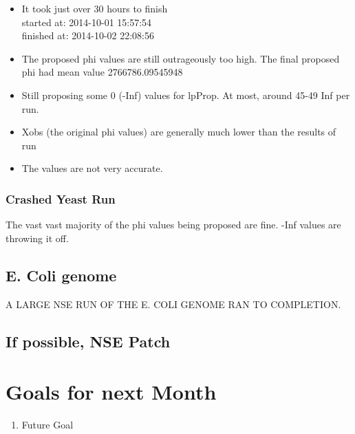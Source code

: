 \begin{itemize}
\item It took just over 30 hours to finish\\
started at: 2014-10-01 15:57:54\\
finished at: 2014-10-02 22:08:56 

\item The proposed phi values are still outrageously too high. The final proposed phi had mean value 2766786.09545948

\item Still proposing some 0 (-Inf) values for lpProp. At most, around 45-49 Inf per run.

\item Xobs (the original phi values) are generally much lower than the results of run

\item The values are not very accurate.

\end{itemize}


\subsubsection{Crashed Yeast Run}

The vast vast majority of the phi values being proposed are fine. -Inf values are throwing it off. 


\subsection{E. Coli genome}

A LARGE NSE RUN OF THE E. COLI GENOME RAN TO COMPLETION.



\subsection{If possible, NSE Patch}






\section{Goals for next Month}
\begin{enumerate}
\item Future Goal
\end{enumerate}


